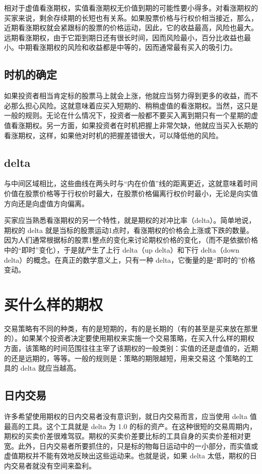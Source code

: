 相对于虚值看涨期权，实值看涨期权无价值到期的可能性要小得多。对看涨期权的买家来说，剩余存续期的长短也有关系。如果股票价格与行权价相当接近，那么，近期看涨期权就会紧跟标的股票的价格运动，因此，它的收益最高，风险也最大。远期看涨期权，由于它距到期日还有很长时间，因而风险最小，百分比收益也最小。中期看涨期权的风险和收益都是中等的，因而通常最有买入的吸引力。
\subsection*{时机的确定}
如果投资者相当肯定标的股票马上就会上涨，他就应当努力得到更多的收益，而不必那么担心风险。这就意味着应买入短期的、稍稍虚值的看涨期权。当然，这只是一般的规则。无论在什么情况下，投资者一般都不要买入离到期只有一个星期的虚值看涨期权。另一方面，如果投资者在时机把握上非常欠缺，他就应当买入长期的看涨期权，这样，如果他对时机的把握差错很大，可以降低他的风险。
\subsection*{delta}
与中间区域相比，这些曲线在两头时与“内在价值”线的距离更近，这就意味着时间价值在股票价格等于行权价时最大，在股票价格偏离行权价时最小，无论是向实值方向还是向虚值方向偏离。

买家应当熟悉看涨期权的另一个特性，就是期权的对冲比率（delta）。简单地说，期权的 delta 就是当标的股票运动1点时，看涨期权的价格会上涨或下跌的数量。因为人们通常根据标的股票1整点的变化来讨论期权价格的变化，（而不是依据价格中的“即时”变化），于是就产生了上行 delta（up delta）和下行 delta（down delta）的概念。在真正的数学意义上，只有一种 delta，它衡量的是“即时的”价格变动。
\section{买什么样的期权}
交易策略有不同的种类，有的是短期的，有的是长期的（有的甚至是买来放在那里的）。如果某个投资者决定要使用期权来实施一个交易策略，在买入什么样的期权方面，该策略的时间范围往往主宰了该期权的一般类别：实值的还是虚值的，近期的还是远期的，等等。一般的规则是：策略的期限越短，用来交易这
个策略的工具的 delta 就应当越高。
\subsection*{日内交易}
许多希望使用期权的日内交易者没有意识到，就日内交易而言，应当使用 delta 值最高的工具。这个工具就是 delta 为 1.0 的标的资产。在这种很短的交易周期内，期权的买卖价差很难驾驭。期权的买卖价差要比标的工具自身的买卖价差相对更宽。此外，日内交易者所要抓住的，只是标的物每日运动中的一小部分，而实值或虚值期权并不能有效地反映出这些运动来。也就是说，如果 delta 太低，期权的日内交易者就没有空间来盈利。
